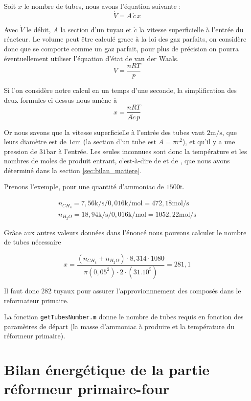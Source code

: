 \documentclass[a4paper, oneside, 12pt]{article}
\begin{document}
Soit $x$ le nombre de tubes, nous avons l'équation suivante :
\[
	\dot{V} = A \, \dot{c} \, x
\]

Avec $\dot{V}$ le débit, $A$ la section d'un tuyau 
et $\dot{c}$ la vitesse superficielle à l'entrée du réacteur.
Le volume peut être calculé grace à la loi des gaz parfaits,
on considère donc que  se comporte comme un gaz parfait,
pour plus de précision on pourra éventuellement utiliser l'équation
d'état de van der Waals.
\[
	V = \frac{n R T}{p}
\]

Si l'on considère notre calcul en un temps d'une seconde, 
la simplification des deux formules ci-dessus nous amène à
\[
	x = \frac{n R T}{A \dot{c} \, p}
\]

Or nous savons que la vitesse superficielle à l'entrée des tubes 
vaut $2 \si{\meter\per\second}$,
que leurs diamètre est de $1 \si{\centi\meter}$ 
(la section d'un tube est $A = \pi r^2$),
et qu'il y a une pression de $31 \si{\bar}$ à l'entrée.
Les seules inconnues sont donc la température et les nombres de moles
de produit entrant, c'est-à-dire de  et de ,
que nous avons déterminé dans la section \ref{sec:bilan_matiere}.

Prenons l'exemple, pour une quantité d'ammoniac de $1500 \si{\tonne}$.

\begin{align*}
	n_{CH_{4}} = 7,56 \si{\kilo\per\second} / 0,016 \si{\kilo\per\mole} 
	= 472,18 \si{\mole\per\second} \\
	n_{H_{2}O} = 18,94 \si{\kilo\per\second}/ 0,016 \si{\kilo\per\mole}
	= 1052,22 \si{\mole\per\second}
\end{align*}

Grâce aux autres valeurs données dans l'énoncé 
nous pouvons calculer le nombre de tubes nécessaire 

\[
	x = \frac{(n_{CH_{4}}+n_{H_{2}O}) \cdot 8,314 \cdot1080}
	{\pi(0,05^2) \cdot 2 \cdot (31.10^5)} = 281,1
\]

Il faut donc 282 tuyaux pour assurer l'approvionnnement 
des composés dans le reformateur primaire.

La fonction \texttt{getTubesNumber.m} donne le
nombre de tubes requis en fonction des paramètres de départ (la masse d'ammoniac 
à produire et la température du réformeur primaire).

\section{Bilan énergétique de la partie réformeur primaire-four}
\end{document}

